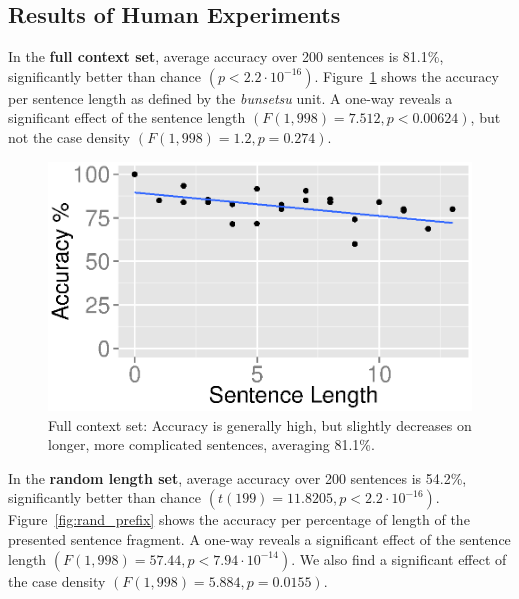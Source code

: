 \subsection{Results of Human Experiments}
\label{sec:results}


In the {\bf full context set}, average accuracy over 200 sentences is 81.1\%,
significantly better than chance $(p<2.2 \cdot 10^{-16})$.
Figure~\ref{fig:full_prefix} shows the accuracy per sentence length as defined
by the {\it bunsetsu} unit.  A one-way  reveals a significant effect
of the sentence length $(F(1,998)=7.512, p<0.00624)$, but not the case density
$(F(1,998)=1.2, p=0.274)$.

\begin{figure}[t!]
 \begin{center}
 \includegraphics[width=1.0\linewidth]{2016_conll_verbpred/figures/full-pref-len}
 \caption{Full context set: Accuracy is generally high, but
   slightly decreases on longer, more complicated sentences, averaging
   81.1\%.}
 \label{fig:full_prefix}
  \end{center}
\end{figure}

In the {\bf random length set}, average accuracy over 200 sentences is 54.2\%,
significantly better than chance $(t(199) = 11.8205,
p<2.2\cdot10^{-16})$. Figure~\ref{fig:rand_prefix} shows the accuracy per
percentage of length of the presented sentence fragment.  A one-way 
reveals a significant effect of the sentence length
$(F(1,998)=57.44, p<7.94\cdot10^{-14})$.  We also find a significant effect of
the case density $(F(1,998)=5.884, p=0.0155)$.













